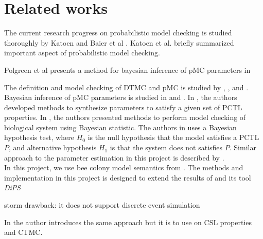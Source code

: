 \chapter{Related works}

The current research progress on probabilistic model checking is studied thoroughly by Katoen and Baier et al \cite{baier2008principles}. Katoen et al. \cite{katoen2016probabilistic} briefly summarized important aspect of probabilistic model checking.

Polgreen et al \cite{polgreen2016data} presents a method for bayesian inference of pMC parameters in


The definition and model checking of DTMC and pMC is studied by
\cite{baier2008principles}, \cite{hutschenreiter2017parametric}, and \cite{katoen2016probabilistic}.\\
Bayesian inference of pMC parameters is studied in \cite{polgreen2016data} and
\cite{jha2009bayesian}. In \cite{polgreen2016data}, the authors developed
methods to synthesize parameters to satisfy a given set of PCTL properties. In
\cite{jha2009bayesian}, the authors presented methods to perform model checking
of biological system using Bayesian statistic. The authors in
\cite{jha2009bayesian} uses a Bayesian hypothesis test, where $H_0$ is the null
hypothesis that the model satisfies a PCTL $P$, and alternative hypothesis $H_1$
is that the system does not satisfies $P$. Similar approach to the parameter
estimation in this project is described by \cite{hussain2015automated}.\\
In this project, we use bee colony model semantics from \cite{hajnal2019data}.
The methods and implementation in this project is designed to extend the results
of \cite{hajnal2019data} and its tool \textit{DiPS}

storm drawback: it does not support discrete event simulation

In \cite{molyneux2020abc} the author introduces the same approach but it is to use on CSL properties and CTMC.